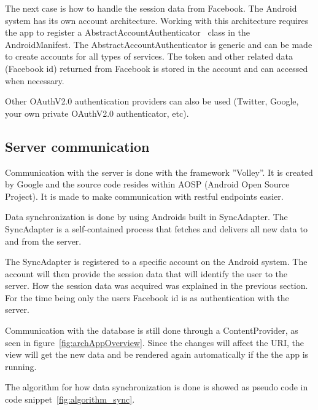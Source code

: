 The next case is how to handle the session data from Facebook. The Android system has its own account architecture. Working with this architecture requires the app to register a AbstractAccountAuthenticator~\cite{androidAccount} class in the AndroidManifest. The AbstractAccountAuthenticator is generic and can be made to create accounts for all types of services. The token and other related data (Facebook id) returned from Facebook is stored in the account and can accessed when necessary.

Other OAuthV2.0 authentication providers can also be used (Twitter, Google, your own private OAuthV2.0 authenticator, etc). 


\subsection{Server communication}
Communication with the server is done with the framework ''Volley''. It is created by Google and the source code resides within AOSP (Android Open Source Project). It is made to make communication with restful endpoints easier.

Data synchronization is done by using Androids built in SyncAdapter. The SyncAdapter is a self-contained process that fetches and delivers all new data to and from the server. 

The SyncAdapter is registered to a specific account on the Android system. The account will then provide the session data that will identify the user to the server. How the session data was acquired was explained in the previous section. For the time being only the users Facebook id is as authentication with the server. 


Communication with the database is still done through a ContentProvider, as seen in figure~\ref{fig:archAppOverview}. Since the changes will affect the URI, the view will get the new data and be rendered again automatically if the the app is running.

The algorithm for how data synchronization is done is showed as pseudo code in code snippet~\ref{fig:algorithm_sync}.\\

